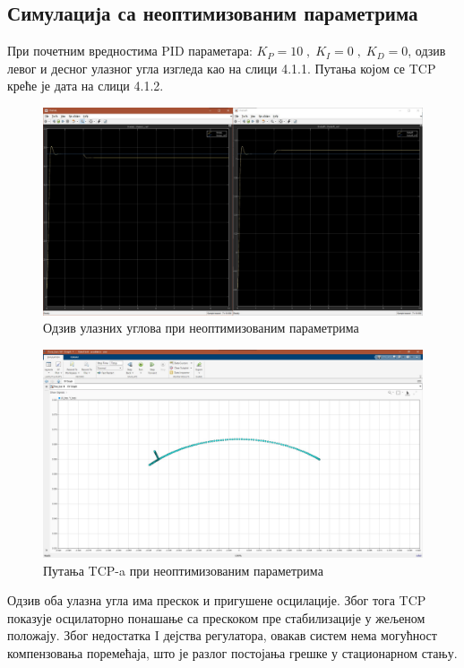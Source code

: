 \documentclass[12pt]{article}
\begin{document}
\subsection{Симулација са неоптимизованим параметрима}
При почетним вредностима PID параметара: $K_P=10\;,\;K_I=0\;,\;K_D=0$, одзив левог и десног улазног угла изгледа као на слици 4.1.1. Путања којом се TCP креће је дата на слици 4.1.2.
\begin{figure}[H]
    \centering
    \includegraphics[width=17.5cm]{figures/theta_neopti.jpg}
    \caption{Одзив улазних углова при неоптимизованим параметрима}
    \label{fig:theta_neopti}
\end{figure}
\begin{figure}[H]
    \centering
    \includegraphics[width=17.5cm]{figures/xy_neopti.jpg}
    \caption{Путања TCP-a при неоптимизованим параметрима}
    \label{fig:xy_neopti}
\end{figure}

Одзив оба улазна угла има прескок и пригушене осцилације. Због тога TCP показује осцилаторно понашање са прескоком пре стабилизације у жељеном положају. Због недостатка I дејства регулатора, овакав систем нема могућност компензовања поремећаја, што је разлог постојања грешке у стационарном стању.
\end{document}

